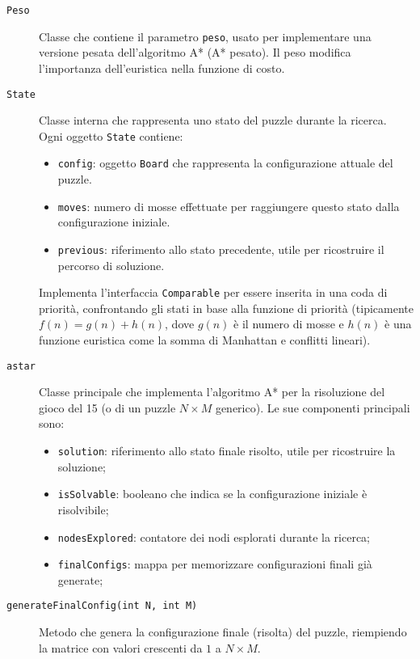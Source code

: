 \begin{description}

    \item[\texttt{Peso}] 
        Classe che contiene il parametro \texttt{peso}, usato per implementare una versione pesata dell'algoritmo A* (A* pesato). Il peso modifica l'importanza dell'euristica nella funzione di costo.

    \item[\texttt{State}] 
        Classe interna che rappresenta uno stato del puzzle durante la ricerca. Ogni oggetto \texttt{State} contiene:
        \begin{itemize}
            \item \texttt{config}: oggetto \texttt{Board} che rappresenta la configurazione attuale del puzzle.
            \item \texttt{moves}: numero di mosse effettuate per raggiungere questo stato dalla configurazione iniziale.
            \item \texttt{previous}: riferimento allo stato precedente, utile per ricostruire il percorso di soluzione.
        \end{itemize}
        Implementa l'interfaccia \texttt{Comparable} per essere inserita in una coda di priorità, confrontando gli stati in base alla funzione di priorità (tipicamente $f(n) = g(n) + h(n)$, dove $g(n)$ è il numero di mosse e $h(n)$ è una funzione euristica come la somma di Manhattan e conflitti lineari).

    \item[\texttt{astar}] 
        Classe principale che implementa l'algoritmo A* per la risoluzione del gioco del 15 (o di un puzzle $N \times M$ generico). Le sue componenti principali sono:
        \begin{itemize}
            \item \texttt{solution}: riferimento allo stato finale risolto, utile per ricostruire la soluzione;
            \item \texttt{isSolvable}: booleano che indica se la configurazione iniziale è risolvibile;
            \item \texttt{nodesExplored}: contatore dei nodi esplorati durante la ricerca;
            \item \texttt{finalConfigs}: mappa per memorizzare configurazioni finali già generate;
        \end{itemize}

    \item[\texttt{generateFinalConfig(int N, int M)}]
        Metodo che genera la configurazione finale (risolta) del puzzle, riempiendo la matrice con valori crescenti da $1$ a $N \times M$.


\end{description}
